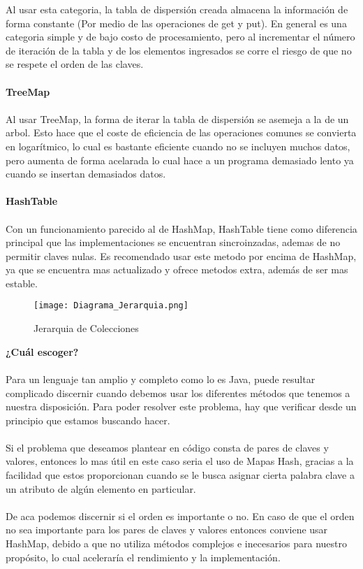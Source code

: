 \documentclass{article}
\begin{document}
	\normalsize Al usar esta categoria, la tabla de dispersión creada almacena la información de forma constante (Por medio de las operaciones de get y put). En general es una categoria simple y de bajo costo de procesamiento, pero al incrementar 
	el número de iteración de la tabla y de los elementos ingresados se corre el riesgo de que no se respete el orden de las claves.
	\\
	\\
	\large \textbf{TreeMap}
	\\
	\\
	\normalsize Al usar TreeMap, la forma de iterar la tabla de dispersión se asemeja a la de un arbol. Esto hace que el coste de eficiencia de las operaciones comunes se convierta en logarítmico, lo cual es bastante eficiente cuando no se incluyen muchos datos, 
	pero aumenta de forma acelarada lo cual hace a un programa demasiado lento ya cuando se insertan demasiados datos.
	\\
	\\
	\large \textbf{HashTable}
	\\
	\\
	\normalsize Con un funcionamiento parecido al de HashMap, HashTable tiene como diferencia principal que las implementaciones se encuentran sincroinzadas, ademas de no permitir claves nulas. Es recomendado usar este metodo por encima de HashMap, ya
	que se encuentra mas actualizado y ofrece metodos extra, además de ser mas estable.
	\newpage
	\begin{figure}
		\texttt{[image: Diagrama\_Jerarquia.png]}
		\caption{Jerarquia de Colecciones}
		\label{fig:Jerarquia}
	\end{figure}
	\Large \textbf{¿Cuál escoger?}
	\\
	\\
	\normalsize Para un lenguaje tan amplio y completo como lo es Java, puede resultar complicado discernir cuando debemos usar los diferentes métodos que tenemos a nuestra disposición. Para poder resolver este problema, hay que verificar desde un principio que estamos buscando hacer.
	\\
	\\
	Si el problema que deseamos plantear en código consta de pares de claves y valores, entonces lo mas útil en este caso seria el uso de Mapas Hash, gracias a la facilidad que estos proporcionan cuando se le busca asignar cierta palabra clave a un atributo de algún elemento en particular.
	\\
	\\
	De aca podemos discernir si el orden es importante o no. En caso de que el orden no sea importante para los pares de claves y valores entonces conviene usar HashMap, debido a que no utiliza métodos complejos e inecesarios para nuestro propósito, lo cual aceleraría el rendimiento y la implementación.
\end{document}
